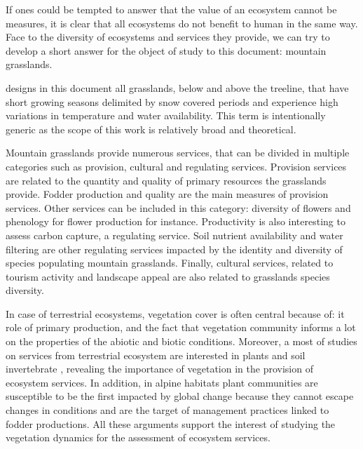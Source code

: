 If ones could be tempted to answer that the value of an ecosystem cannot be measures, it is clear that all ecosystems do not benefit to human in the same way. Face to the diversity of ecosystems and services they provide, we can try to develop a short answer for the object of study to this document: mountain grasslands.

 designs in this document all grasslands, below and above the treeline, that have short growing seasons delimited by snow covered periods and experience high variations in temperature and water availability. This term is intentionally generic as the scope of this work is relatively broad and theoretical.

Mountain grasslands provide numerous services, that can be divided in multiple categories such as provision, cultural and regulating services. Provision services are related to the quantity and quality of primary resources the grasslands provide. Fodder production and quality are the main measures of provision services. Other services can be included in this category: diversity of flowers and phenology for flower production for instance. Productivity is also interesting to assess carbon capture, a regulating service. Soil nutrient availability and water filtering are other regulating services impacted by the identity and diversity of species populating mountain grasslands. Finally, cultural services, related to tourism activity and landscape appeal are also related to grasslands species diversity.


In case of terrestrial ecosystems, vegetation cover is often central because of: it role of primary production, and the fact that vegetation community informs a lot on the properties of the abiotic and biotic conditions. Moreover, a most of studies on services from terrestrial ecosystem are interested in plants and soil invertebrate \cite{de_bello_towards_2010}, revealing the importance of vegetation in the provision of ecosystem services. In addition, in alpine habitats plant communities are susceptible to be the first impacted by global change because they cannot escape changes in conditions and are the target of management practices linked to fodder productions. All these arguments support the interest of studying the vegetation dynamics for the assessment of ecosystem services.


